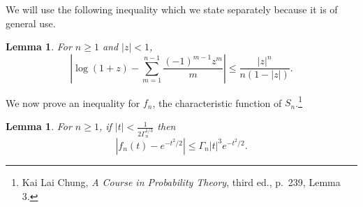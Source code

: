 \documentclass{article}
\newtheorem{lemma}[theorem]{Lemma}
\theoremstyle{definition}
\begin{document}
We will use the following inequality which we state separately
because it is of general use.

\begin{lemma}
For $n \geq 1$ and $|z|<1$,
\[
\left| \log(1+z) - \sum_{m=1}^{n-1} \frac{(-1)^{m-1} z^m}{m} \right| \leq \frac{|z|^n}{n(1-|z|)}.
\]
\label{logarithm}
\end{lemma}

We now prove an inequality for $f_n$, the characteristic function of $S_n$.\footnote{Kai Lai Chung,
{\em A Course in Probability Theory}, third ed., p.~239, Lemma 3.}

\begin{lemma}
For $n \geq 1$, if $|t| < \frac{1}{2\Gamma_n^{1/3}}$ then
\[
|f_n(t)-e^{-t^2/2}| \leq \Gamma_n|t|^3 e^{-t^2/2}.
\]
\label{Gamma1}
\end{lemma}
\end{document}
